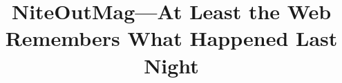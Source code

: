 \documentclass{acm_proc_article-sp}
\begin{document}

\title{NiteOutMag\hspace{-1.5pt}---At Least the Web\\ Remembers What Happened Last Night}

\author{
}


\maketitle
\end{document}
